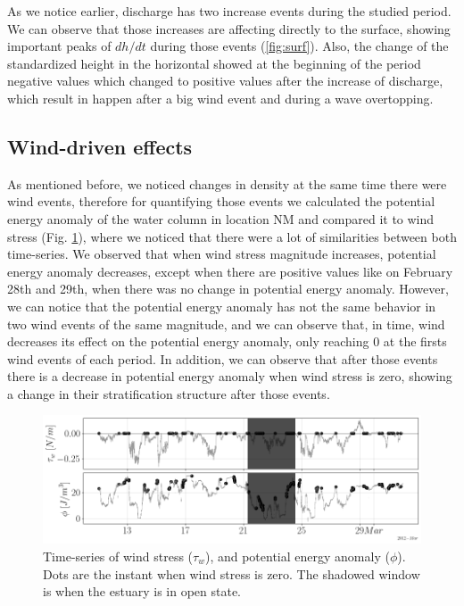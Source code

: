 \documentclass[tesis.tex]{subfiles}
\begin{document}
As we notice earlier, discharge has two increase events during the studied period. We can observe that those increases are affecting directly to the surface, showing important peaks of $dh/dt$ during those events (\ref{fig:surf}). Also, the change of the standardized height in the horizontal showed at the beginning of the period negative values which changed to positive values after the increase of discharge, which result in happen after a big wind event and during a wave overtopping.\\

\subsection{Wind-driven effects}

As mentioned before, we noticed changes in density at the same time there were wind events, therefore for quantifying those events we calculated the potential energy anomaly of the water column in location NM and compared it to wind stress (Fig. \ref{fig:phi}), where we noticed that there were a lot of similarities between both time-series. We observed that when wind stress magnitude increases, potential energy anomaly decreases, except when there are positive values like on February 28th and 29th, when there was no change in potential energy anomaly. However, we can notice that the potential energy anomaly has not the same behavior in two wind events of the same magnitude, and we can observe that, in time, wind decreases its effect on the potential energy anomaly, only reaching 0 at the firsts wind events of each period. In addition, we can observe that after those events there is a decrease in potential energy anomaly when wind stress is zero, showing a change in their stratification structure after those events.\\

\begin{figure}[h!]
    \centering
    \includegraphics[width=\textwidth]{Imagenes/phi.png}
    \caption{Time-series of wind stress ($\tau_w$), and potential energy anomaly ($\phi$). Dots are the instant when wind stress is zero. The shadowed window is when the estuary is in open state.}
    \label{fig:phi}
\end{figure}
\end{document}
